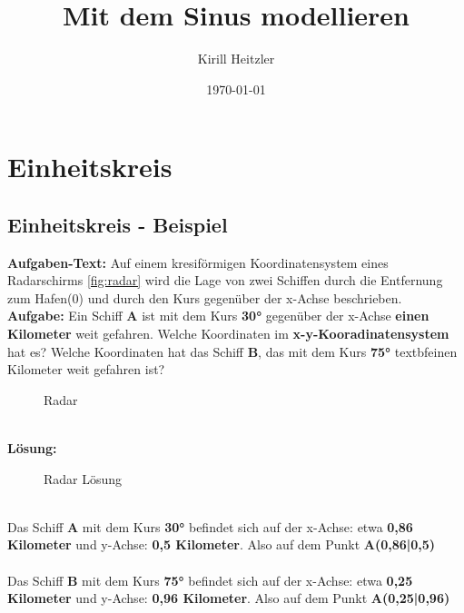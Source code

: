 \documentclass[12pt,a4paper]{article}
\title{Mit dem Sinus modellieren}
\author{Kirill Heitzler}
\date{\today}
\begin{document}
\maketitle
\newpage

\tableofcontents



\section{Einheitskreis}
\subsection{Einheitskreis - Beispiel}

\textbf{Aufgaben-Text:} Auf einem kresiförmigen Koordinatensystem eines Radarschirms \autoref{fig:radar} wird die Lage von zwei Schiffen durch die Entfernung zum Hafen(0) und durch den Kurs gegenüber der x-Achse beschrieben. \\
\textbf{Aufgabe:} Ein Schiff \textbf{A} ist mit dem Kurs \textbf{30°} gegenüber der x-Achse \textbf{einen Kilometer} weit gefahren. Welche Koordinaten im \textbf{x-y-Kooradinatensystem} hat es? Welche Koordinaten hat das Schiff \textbf{B}, das mit dem Kurs \textbf{75°} textbf{einen Kilometer} weit gefahren ist?
\begin{figure}[hb!]
	\centering
	\def\svgwidth{250px}
	
	\caption{Radar}
	\label{fig:radar}
\end{figure}
\\
\noindent
\textbf{Lösung:}
\begin{wrapfigure}[9]{r}{0.5\textwidth}
	\def\svgwidth{250px}
	
	\caption{Radar Lösung}
	\label{fig:radar_loesung}
\end{wrapfigure}
\\
Das Schiff \textbf{A} mit dem Kurs \textbf{30°} befindet sich auf der x-Achse: etwa \textbf{0,86 Kilometer} und y-Achse: \textbf{0,5 Kilometer}. Also auf dem Punkt \textbf{A(0,86|0,5)} \\  \\
Das Schiff \textbf{B} mit dem Kurs \textbf{75°} befindet sich auf der x-Achse: etwa \textbf{0,25 Kilometer} und y-Achse: \textbf{0,96 Kilometer}. Also auf dem Punkt \textbf{A(0,25|0,96)}
\end{document}
